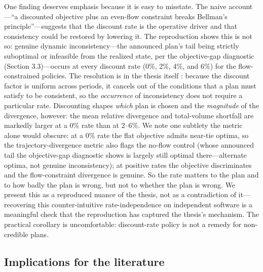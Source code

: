 One finding deserves emphasis because it is easy to misstate. The naive account---``a discounted objective plus an even-flow constraint breaks Bellman's principle''---suggests that the discount rate is the operative driver and that consistency could be restored by lowering it. The reproduction shows this is not so: genuine dynamic inconsistency---the announced plan's tail being strictly suboptimal or infeasible from the realized state, per the objective-gap diagnostic (Section 3.3)---occurs at every discount rate (0\%, 2\%, 4\%, and 6\%) for the flow-constrained policies. The resolution is in the thesis itself \citep[ch.~3, p.~58--59]{daugherty1991credibility}: because the discount factor is uniform across periods, it cancels out of the conditions that a plan must satisfy to be consistent, so the \emph{occurrence} of inconsistency does not require a particular rate. Discounting shapes \emph{which} plan is chosen and the \emph{magnitude} of the divergence, however: the mean relative divergence and total-volume shortfall are markedly larger at a 0\% rate than at 2--6\%. We note one subtlety the metric alone would obscure: at a 0\% rate the flat objective admits near-tie optima, so the trajectory-divergence metric also flags the no-flow control (whose announced tail the objective-gap diagnostic shows is largely still optimal there---alternate optima, not genuine inconsistency); at positive rates the objective discriminates and the flow-constraint divergence is genuine. So the rate matters to the plan and to how badly the plan is wrong, but not to whether the plan is wrong. We present this as a reproduced nuance of the thesis, not as a contradiction of it---recovering this counter-intuitive rate-independence on independent software is a meaningful check that the reproduction has captured the thesis's mechanism. The practical corollary is uncomfortable: discount-rate policy is not a remedy for non-credible plans.

\hypertarget{implications-for-the-literature}{%
\subsection{Implications for the literature}\label{implications-for-the-literature}}

